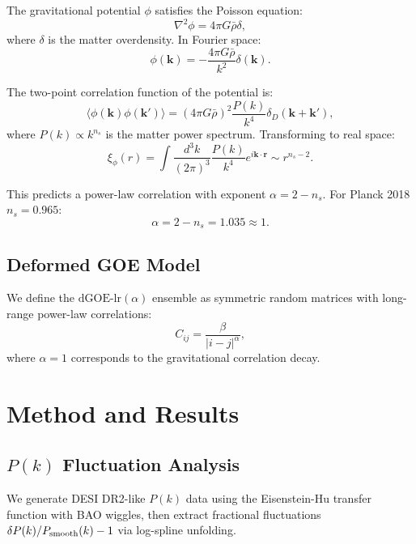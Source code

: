 \documentclass[12pt,a4paper]{article}
\begin{document}
The gravitational potential $\phi$ satisfies the Poisson equation:
\begin{equation}
\nabla^2 \phi = 4\pi G \bar{\rho} \delta,
\end{equation}
where $\delta$ is the matter overdensity. In Fourier space:
\begin{equation}
\phi(\mathbf{k}) = -\frac{4\pi G \bar{\rho}}{k^2} \delta(\mathbf{k}).
\end{equation}

The two-point correlation function of the potential is:
\begin{equation}
\langle \phi(\mathbf{k}) \phi(\mathbf{k}') \rangle = (4\pi G \bar{\rho})^2 \frac{P(k)}{k^4} \delta_D(\mathbf{k} + \mathbf{k}'),
\end{equation}
where $P(k) \propto k^{n_s}$ is the matter power spectrum. Transforming to real space:
\begin{equation}
\xi_\phi(r) = \int \frac{d^3k}{(2\pi)^3} \frac{P(k)}{k^4} e^{i\mathbf{k}\cdot\mathbf{r}} \sim r^{n_s - 2}.
\end{equation}

This predicts a power-law correlation with exponent $\alpha = 2 - n_s$. For Planck 2018 $n_s = 0.965$:
\begin{equation}
\boxed{\alpha = 2 - n_s = 1.035 \approx 1}.
\end{equation}

\subsection{Deformed GOE Model}

We define the $\mathrm{dGOE\text{-}lr}(\alpha)$ ensemble as symmetric random matrices with long-range power-law correlations:
\begin{equation}
C_{ij} = \frac{\beta}{|i - j|^\alpha},
\end{equation}
where $\alpha = 1$ corresponds to the gravitational correlation decay.

\section{Method and Results}

\subsection{$P(k)$ Fluctuation Analysis}

We generate DESI DR2-like $P(k)$ data using the Eisenstein-Hu transfer function with BAO wiggles, then extract fractional fluctuations $\delta P(k) / P_{\rm smooth}(k) - 1$ via log-spline unfolding.
\end{document}
